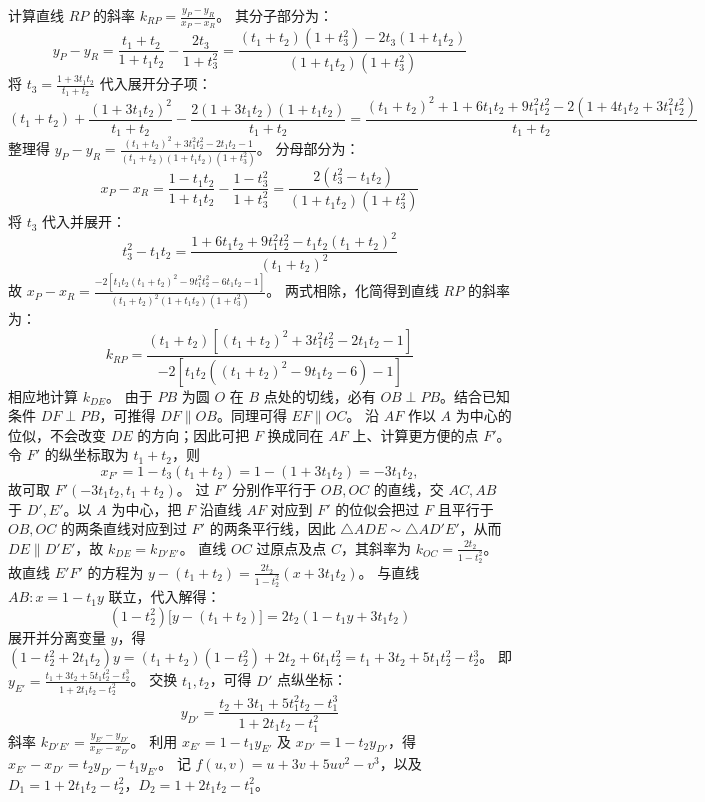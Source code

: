 \begin{solution}
计算直线 $RP$ 的斜率 $k_{RP} = \frac{y_P - y_R}{x_P - x_R}$。
其分子部分为：
\[ y_P - y_R = \frac{t_1+t_2}{1+t_1 t_2} - \frac{2t_3}{1+t_3^2} = \frac{(t_1+t_2)(1+t_3^2) - 2t_3(1+t_1 t_2)}{(1+t_1 t_2)(1+t_3^2)} \]
将 $t_3 = \frac{1+3t_1 t_2}{t_1+t_2}$ 代入展开分子项：
\[ (t_1+t_2) + \frac{(1+3t_1 t_2)^2}{t_1+t_2} - \frac{2(1+3t_1 t_2)(1+t_1 t_2)}{t_1+t_2} = \frac{(t_1+t_2)^2 + 1 + 6t_1 t_2 + 9t_1^2 t_2^2 - 2(1 + 4t_1 t_2 + 3t_1^2 t_2^2)}{t_1+t_2} \]
整理得 $y_P - y_R = \frac{(t_1+t_2)^2 + 3t_1^2 t_2^2 - 2t_1 t_2 - 1}{(t_1+t_2)(1+t_1 t_2)(1+t_3^2)}$。
分母部分为：
\[ x_P - x_R = \frac{1-t_1 t_2}{1+t_1 t_2} - \frac{1-t_3^2}{1+t_3^2} = \frac{2(t_3^2 - t_1 t_2)}{(1+t_1 t_2)(1+t_3^2)} \]
将 $t_3$ 代入并展开：
\[ t_3^2 - t_1 t_2 = \frac{1 + 6t_1 t_2 + 9t_1^2 t_2^2 - t_1 t_2(t_1+t_2)^2}{(t_1+t_2)^2} \]
故 $x_P - x_R = \frac{-2 \left[ t_1 t_2 (t_1+t_2)^2 - 9t_1^2 t_2^2 - 6t_1 t_2 - 1 \right]}{(t_1+t_2)^2(1+t_1 t_2)(1+t_3^2)}$。
两式相除，化简得到直线 $RP$ 的斜率为：
\[ k_{RP} = \frac{(t_1+t_2) \left[ (t_1+t_2)^2 + 3t_1^2 t_2^2 - 2t_1 t_2 - 1 \right]}{-2 \left[ t_1 t_2 ( (t_1+t_2)^2 - 9t_1 t_2 - 6 ) - 1 \right]} \]
相应地计算 $k_{DE}$。
由于 $PB$ 为圆 $O$ 在 $B$ 点处的切线，必有 $OB \perp PB$。结合已知条件 $DF \perp PB$，可推得 $DF \parallel OB$。同理可得 $EF \parallel OC$。
沿 $AF$ 作以 $A$ 为中心的位似，不会改变 $DE$ 的方向；因此可把 $F$ 换成同在 $AF$ 上、计算更方便的点 $F'$。令 $F'$ 的纵坐标取为 $t_1+t_2$，则
\[
x_{F'}=1-t_3(t_1+t_2)=1-(1+3t_1t_2)=-3t_1t_2,
\]
故可取 $F'(-3t_1t_2,t_1+t_2)$。
过 $F'$ 分别作平行于 $OB, OC$ 的直线，交 $AC, AB$ 于 $D', E'$。以 $A$ 为中心，把 $F$ 沿直线 $AF$ 对应到 $F'$ 的位似会把过 $F$ 且平行于 $OB,OC$ 的两条直线对应到过 $F'$ 的两条平行线，因此 $\triangle ADE \sim \triangle AD'E'$，从而 $DE \parallel D'E'$，故 $k_{DE} = k_{D'E'}$。
直线 $OC$ 过原点及点 $C$，其斜率为 $k_{OC} = \frac{2t_2}{1-t_2^2}$。
故直线 $E'F'$ 的方程为 $y - (t_1+t_2) = \frac{2t_2}{1-t_2^2}(x + 3t_1 t_2)$。
与直线 $AB: x = 1 - t_1 y$ 联立，代入解得：
\[ (1-t_2^2) \big[ y - (t_1+t_2) \big] = 2t_2(1 - t_1 y + 3t_1 t_2) \]
展开并分离变量 $y$，得 $(1 - t_2^2 + 2t_1 t_2)y = (t_1+t_2)(1-t_2^2) + 2t_2 + 6t_1 t_2^2 = t_1 + 3t_2 + 5t_1 t_2^2 - t_2^3$。
即 $y_{E'} = \frac{t_1 + 3t_2 + 5t_1 t_2^2 - t_2^3}{1 + 2t_1 t_2 - t_2^2}$。
交换 $t_1, t_2$，可得 $D'$ 点纵坐标：
\[ y_{D'} = \frac{t_2 + 3t_1 + 5t_1^2 t_2 - t_1^3}{1 + 2t_1 t_2 - t_1^2} \]
斜率 $k_{D'E'} = \frac{y_{E'} - y_{D'}}{x_{E'} - x_{D'}}$。
利用 $x_{E'} = 1 - t_1 y_{E'}$ 及 $x_{D'} = 1 - t_2 y_{D'}$，得 $x_{E'} - x_{D'} = t_2 y_{D'} - t_1 y_{E'}$。
记 $f(u,v) = u + 3v + 5uv^2 - v^3$，以及 $D_1 = 1 + 2t_1 t_2 - t_2^2$，$D_2 = 1 + 2t_1 t_2 - t_1^2$。

\end{solution}
